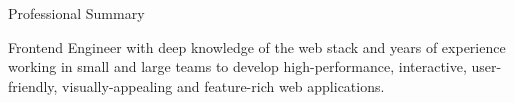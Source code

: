\documentclass{resume} %
\begin{document}

\begin{rSection}{Professional Summary}

{Frontend Engineer with deep knowledge of the web stack and years of experience working in small and large teams to develop high-performance, interactive, user-friendly, visually-appealing and feature-rich web applications.}

\end{rSection}

\end{document}
